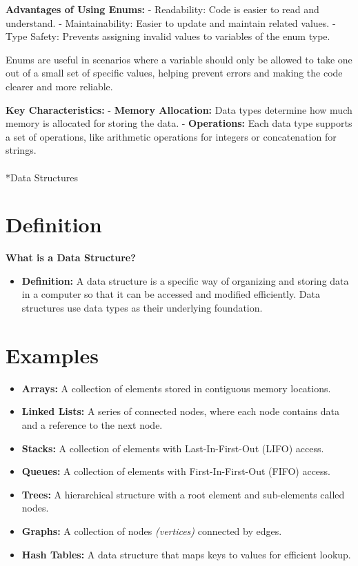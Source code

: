 \documentclass[
  letterpaper,
  DIV=11,
  numbers=noendperiod]{scrreprt}
\makeatletter
\let\oldparagraph\paragraph
\renewcommand{\paragraph}{
    \@ifstar
      \xxxParagraphStar
      \xxxParagraphNoStar
  }
\newcommand{\xxxParagraphStar}[1]{\oldparagraph*{#1}\mbox{}}
\newcommand{\xxxParagraphNoStar}[1]{\oldparagraph{#1}\mbox{}}
\providecommand{\tightlist}{%
  \setlength{\itemsep}{0pt}\setlength{\parskip}{0pt}}
\makeatother
\begin{document}
\textbf{Advantages of Using Enums:} - Readability: Code is easier to
read and understand. - Maintainability: Easier to update and maintain
related values. - Type Safety: Prevents assigning invalid values to
variables of the enum type.

Enums are useful in scenarios where a variable should only be allowed to
take one out of a small set of specific values, helping prevent errors
and making the code clearer and more reliable.

\textbf{Key Characteristics:} - \textbf{Memory Allocation:} Data types
determine how much memory is allocated for storing the data. -
\textbf{Operations:} Each data type supports a set of operations, like
arithmetic operations for integers or concatenation for strings.

\paragraph*{Data Structures}\label{data-structures}

\section{Definition}

\textbf{What is a Data Structure?}

\begin{itemize}
\tightlist
\item
  \textbf{Definition:} A data structure is a specific way of organizing
  and storing data in a computer so that it can be accessed and modified
  efficiently. Data structures use data types as their underlying
  foundation.
\end{itemize}

\section{Examples}

\begin{itemize}
\tightlist
\item
  \textbf{Arrays:} A collection of elements stored in contiguous memory
  locations.
\item
  \textbf{Linked Lists:} A series of connected nodes, where each node
  contains data and a reference to the next node.
\item
  \textbf{Stacks:} A collection of elements with Last-In-First-Out
  (LIFO) access.
\item
  \textbf{Queues:} A collection of elements with First-In-First-Out
  (FIFO) access.
\item
  \textbf{Trees:} A hierarchical structure with a root element and
  sub-elements called nodes.
\item
  \textbf{Graphs:} A collection of nodes \emph{(vertices)} connected by
  edges.
\item
  \textbf{Hash Tables:} A data structure that maps keys to values for
  efficient lookup.
\end{itemize}
\end{document}
